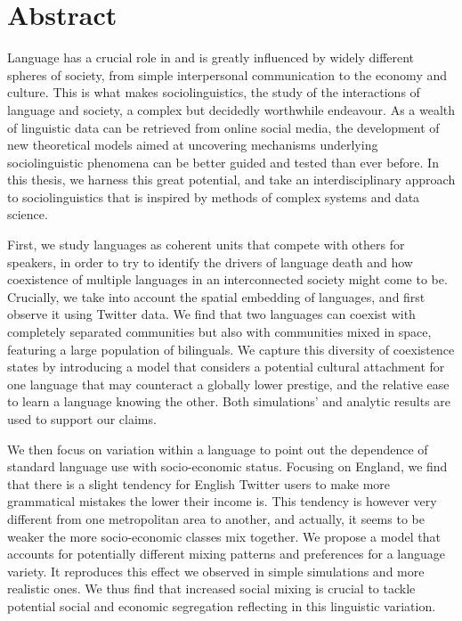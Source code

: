 \documentclass[../thesis.tex]{subfiles}
\begin{document}
\begingroup
\let\cleardoublepage\relax
\let\cleardoublepage\relax

\chapter*{Abstract}
Language has a crucial role in and is greatly influenced by widely different spheres of
society, from simple interpersonal communication to the economy and culture. This is
what makes sociolinguistics, the study of the interactions of language and society, a
complex but decidedly worthwhile endeavour. As a wealth of linguistic data can be
retrieved from online social media, the development of new theoretical models aimed at
uncovering mechanisms underlying sociolinguistic phenomena can be better guided and
tested than ever before. In this thesis, we harness this great potential, and take an
interdisciplinary approach to sociolinguistics that is inspired by methods of complex
systems and data science.

First, we study languages as coherent units that compete with others for speakers, in
order to try to identify the drivers of language death and how coexistence of multiple
languages in an interconnected society might come to be. Crucially, we take into account
the spatial embedding of languages, and first observe it using Twitter data. We find
that two languages can coexist with completely separated communities but also with
communities mixed in space, featuring a large population of bilinguals. We capture this
diversity of coexistence states by introducing a model that considers a potential
cultural attachment for one language that may counteract a globally lower prestige, and
the relative ease to learn a language knowing the other. Both simulations' and
analytic results are used to support our claims.

We then focus on variation within a language to point out the dependence of standard
language use with socio-economic status. Focusing on England, we find
that there is a slight tendency for English Twitter users to make more grammatical
mistakes the lower their income is. This tendency is however very different from one
metropolitan area to another, and actually, it seems to be weaker the more
socio-economic classes mix together. We propose a model that accounts for potentially
different mixing patterns and preferences for a language variety. It reproduces this
effect we observed in simple simulations and more realistic ones.
We thus find that increased social mixing is crucial to tackle potential social and
economic segregation reflecting in this linguistic variation.
\end{document}
